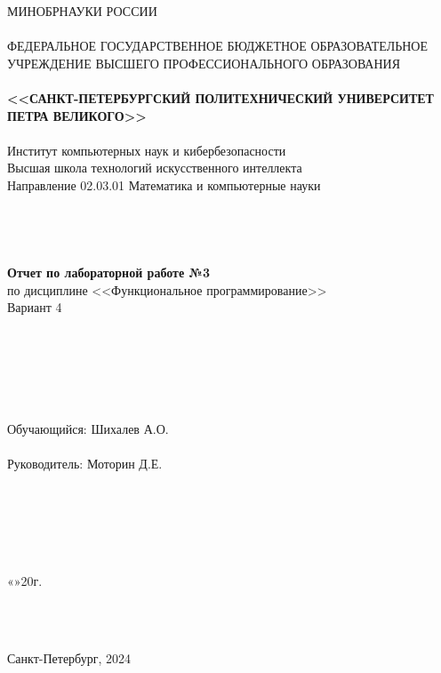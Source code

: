 \documentclass[11pt,a4paper,final]{article} %
\begin{document}
	
	\thispagestyle{empty}
	
	\begin{center}
		{\Large МИНОБРНАУКИ РОССИИ}\\
		~\\
		{\large ФЕДЕРАЛЬНОЕ ГОСУДАРСТВЕННОЕ БЮДЖЕТНОЕ ОБРАЗОВАТЕЛЬНОЕ УЧРЕЖДЕНИЕ ВЫСШЕГО ПРОФЕССИОНАЛЬНОГО ОБРАЗОВАНИЯ}\\
		~\\
		{\Large \bf <<САНКТ-ПЕТЕРБУРГСКИЙ ПОЛИТЕХНИЧЕСКИЙ УНИВЕРСИТЕТ ПЕТРА ВЕЛИКОГО>>}\\
		~\\
		{\large Институт компьютерных наук и кибербезопасности }\\
		{\large Высшая школа технологий искусственного интеллекта}\\
		{\large Направление 02.03.01 Математика и компьютерные науки}\\
		~\\
		~\\
		~\\
		~\\
		{\Large \bf  Отчет по лабораторной работе №3 }\\
		\vspace{3mm}
		{\Large {по дисциплине <<Функциональное программирование>>}}\\
		\vspace{3mm}
		{\Large {Вариант 4}}\\
		~\\
		~\\
		~\\
		~\\
		~\\
		~\\
		{\large Обучающийся: \underline{\hspace{3.5cm}} \hspace{12mm} Шихалев А.О.}\\
		~\\
		{\large Руководитель: \underline{\hspace{3.5cm}} \hspace{12mm} Моторин Д.Е.}\\
		~\\
		~\\
		~\\
		~\\
		~\\
	\end{center}
	\begin{flushright}
		
		«\underline{\hspace{1cm}}»\underline{\hspace{3cm}}20\underline{\hspace{0.7cm}}г.
	\end{flushright}
	~\\
	~\\
	\begin{center}
		{\large Санкт-Петербург, 2024}
	\end{center}
	
\end{document}
